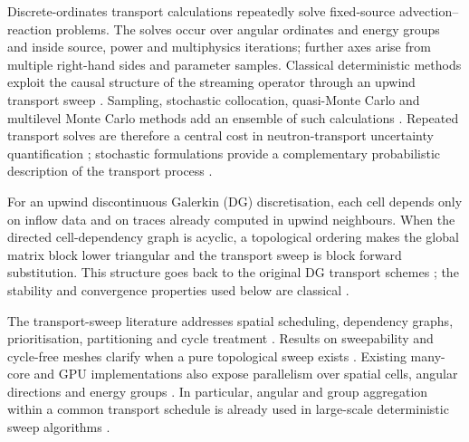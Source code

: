\documentclass[final]{amsart}
\begin{document}
Discrete-ordinates transport calculations repeatedly solve
fixed-source advection--reaction problems. The solves occur over
angular ordinates and energy groups and inside source, power and
multiphysics iterations; further axes arise from multiple right-hand
sides and parameter samples. Classical deterministic methods exploit
the causal structure of the streaming operator through an upwind
transport sweep \cite{LewisMiller1984,AdamsLarsen2002}. Sampling,
stochastic collocation, quasi-Monte Carlo and multilevel Monte Carlo
methods add an ensemble of such calculations
\cite{XiuHesthaven2005,NobileTemponeWebster2008,Owen2013MonteCarlo,
  Giles2008}. Repeated transport solves are therefore a central cost
in neutron-transport uncertainty quantification
\cite{FichtlPrinja2011StochasticCollocation,
  GrahamParkinsonScheichl2018,CoxEtAl2022NTE, PasmannEtAl2022iQMC};
stochastic formulations provide a complementary probabilistic
description of the transport process
\cite{HortonKyprianouVillemonais2020NTEI,
  HarrisHortonKyprianou2020NTEII}.

For an upwind discontinuous Galerkin (DG) discretisation, each cell
depends only on inflow data and on traces already computed in upwind
neighbours. When the directed cell-dependency graph is acyclic, a
topological ordering makes the global matrix block lower triangular and
the transport sweep is block forward substitution. This structure goes
back to the original DG transport schemes
\cite{ReedHill1973,LesaintRaviart1974}; the stability and convergence
properties used below are classical
\cite{JohnsonPitkaranta1986,Cockburn1998IntroDG,CockburnShu2001,
CockburnDongGuzman2008}.

The transport-sweep literature addresses spatial scheduling, dependency
graphs, prioritisation, partitioning and cycle treatment
\cite{KochBakerAlcouffe1992KBA,BakerKoch1998,Pautz2002,
PlimptonEtAl2005,PautzBailey2017,HautEtAl2019,
VermaakEtAl2021}. Results on sweepability and cycle-free meshes
clarify when a pure topological sweep exists
\cite{CamminadyFrank2018Sweepable,AdamsEtAl2019OptimalSweeps,
calloo2026cycle,PeterEtAl2022SweepArepo}. Existing many-core and GPU
implementations also expose parallelism over spatial cells, angular
directions and energy groups
\cite{GongEtAl2011GPUTransport,GongEtAl2012UnstructuredGPU,
DeakinEtAl2018Parallelism,SearlesEtAl2019MiniSweep,
ZhangEtAl2025STRAUM,MorganEtAl2026OneCellGPU}. In particular,
angular and group aggregation within a common transport schedule is
already used in large-scale deterministic sweep algorithms
\cite{AdamsEtAl2019OptimalSweeps,VermaakEtAl2021,
AndrsEtAl2026OpenSn}.
\end{document}

